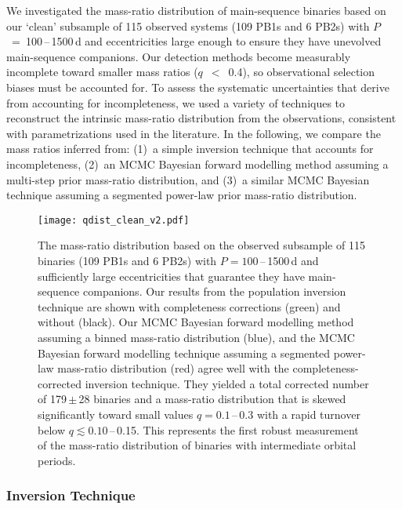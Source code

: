 \documentclass[a4paper,fleqn,usenatbib]{mnras}
\begin{document}
We investigated the mass-ratio distribution of main-sequence binaries based on our `clean' subsample of 115 observed systems (109 PB1s and 6 PB2s) with \mbox{$P$ = 100\,--\,1500\,d} and eccentricities large enough to ensure they have unevolved main-sequence companions.  Our detection methods become measurably incomplete toward smaller mass ratios ($q$~$<$~0.4), so observational selection biases must be accounted for. To assess the systematic uncertainties that derive from accounting for incompleteness, we used a variety of techniques to reconstruct the intrinsic mass-ratio distribution from the observations, consistent with parametrizations used in the literature.  In the following, we compare the mass ratios inferred from: (1)~a simple inversion technique that accounts for incompleteness, (2)~an MCMC Bayesian forward modelling method assuming a multi-step prior mass-ratio distribution, and (3)~a similar MCMC Bayesian technique assuming a segmented power-law prior mass-ratio distribution.  


\begin{figure}
\begin{center}
\texttt{[image: qdist\_clean\_v2.pdf]}
\caption{The mass-ratio distribution based on the observed subsample of 115 binaries (109 PB1s and 6 PB2s) with $P = 100$\,--\,1500\,d and sufficiently large eccentricities that guarantee they have main-sequence companions. Our results from the population inversion technique are shown with completeness corrections (green) and without (black). Our MCMC Bayesian forward modelling method assuming a binned mass-ratio distribution (blue), and the MCMC Bayesian forward modelling technique assuming a segmented power-law mass-ratio distribution (red) agree well with the completeness-corrected inversion technique.  They yielded a total corrected number of 179\,$\pm$\,28 binaries and a mass-ratio distribution that is skewed significantly toward small values $q=0.1$\,--\,0.3 with a rapid turnover below $q \lesssim 0.10$\,--\,0.15.  This represents the first robust measurement of the mass-ratio distribution of binaries with intermediate orbital periods.}
\label{fig:qdist_clean}
\end{center}
\end{figure}


\subsubsection{Inversion Technique}
\label{ssec:inversion}
\end{document}
